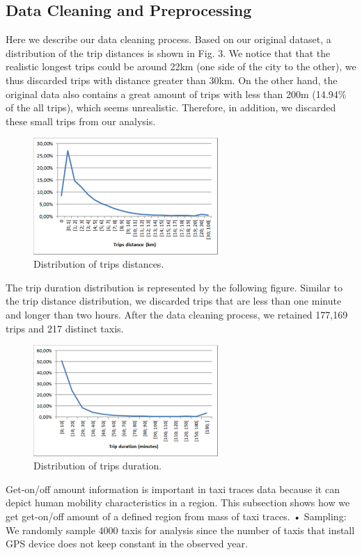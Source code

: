 \documentclass[a4paper, 10pt, conference]{ieeeconf}      %
\begin{document}
\subsection{Data Cleaning and Preprocessing}
Here we describe our data cleaning process. Based on our original dataset, a distribution of the trip distances is shown in Fig. 3. We notice that that the realistic longest trips could be around 22km (one side of the city to the other), we thus discarded trips with distance greater than 30km. On the other hand, the original data also contains a great amount of trips with less than 200m (14.94\% of the all trips), which seems unrealistic. Therefore, in addition, we discarded these small trips from our analysis.  
\begin{figure}[htbp]
    \centering
    \includegraphics[width=7cm]{fig/png3.png}
    \caption{ Distribution of trips distances. }
    \label{fig:my_png_3}
\end{figure}
The trip duration distribution is represented by the following figure. Similar to the trip distance distribution, we discarded trips that are less than one minute and longer than two hours. After the data cleaning process, we retained 177,169 trips and 217 distinct taxis. 
 \begin{figure}[htbp]
    \centering
    \includegraphics[width=7cm]{fig/png4.png}
    \caption{Distribution of trips duration. }
    \label{fig:my_png_4}
\end{figure}


Get-on/off amount information is important in taxi traces data because it can depict human mobility characteristics in a region. This subsection shows how we get get-on/off amount of a defined region from mass of taxi traces. • Sampling: We randomly sample 4000 taxis for analysis since the number of taxis that install GPS device does not keep constant in the observed year.
\end{document}
